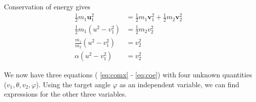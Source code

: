 \documentclass[twoside,english]{uiofysmaster/uiofysmaster}
\let\orgautoref\autoref
\renewcommand{\autoref}
        {%
		 \def\subsectionautorefname{Section}%
		 \def\subsubsectionautorefname{Section}%
          \orgautoref}
\begin{document}
\begin{appendices}
Conservation of energy gives
\begin{align}\label{eq:coe}
	\tfrac{1}{2} m_1 \boldsymbol{u}_1^2 &= \tfrac{1}{2} m_1 \boldsymbol{v}_1^2 + \tfrac{1}{2} m_2 \boldsymbol{v}_2^2 \nonumber\\
	\tfrac{1}{2} m_1 (u^2 - v_1^2) &= \tfrac{1}{2} m_2 v_2^2 \nonumber\\
	\frac{m_1}{m_2} (u^2 - v_1^2) &= v_2^2 \nonumber\\
	\alpha (u^2 - v_1^2) &= v_2^2
\end{align}

We now have three equations (\autoref{eq:comx} - \autoref{eq:coe}) with four unknown quantities ($v_1, \theta, v_2, \varphi$). Using the target angle $\varphi$ as an independent variable, we can find expressions for the other three variables. 


\end{appendices}
\end{document}
